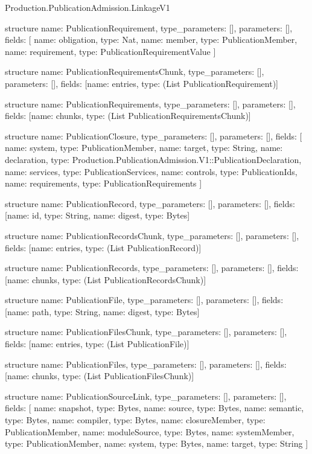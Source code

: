 \begin{lexlean}{Production.PublicationAdmission.LinkageV1}
\begin{semanticmodule}
structure{
  name: PublicationRequirement,
  type_parameters: [],
  parameters: [],
  fields: [
    {name: obligation, type: Nat},
    {name: member, type: PublicationMember},
    {name: requirement, type: PublicationRequirementValue}
  ]
}

structure{
  name: PublicationRequirementsChunk,
  type_parameters: [],
  parameters: [],
  fields: [{name: entries, type: (List PublicationRequirement)}]
}

structure{
  name: PublicationRequirements,
  type_parameters: [],
  parameters: [],
  fields: [{name: chunks, type: (List PublicationRequirementsChunk)}]
}

structure{
  name: PublicationClosure,
  type_parameters: [],
  parameters: [],
  fields: [
    {name: system, type: PublicationMember},
    {name: target, type: String},
    {name: declaration, type: Production.PublicationAdmission.V1::PublicationDeclaration},
    {name: services, type: PublicationServices},
    {name: controls, type: PublicationIds},
    {name: requirements, type: PublicationRequirements}
  ]
}

structure{
  name: PublicationRecord,
  type_parameters: [],
  parameters: [],
  fields: [{name: id, type: String}, {name: digest, type: Bytes}]
}

structure{
  name: PublicationRecordsChunk,
  type_parameters: [],
  parameters: [],
  fields: [{name: entries, type: (List PublicationRecord)}]
}

structure{
  name: PublicationRecords,
  type_parameters: [],
  parameters: [],
  fields: [{name: chunks, type: (List PublicationRecordsChunk)}]
}

structure{
  name: PublicationFile,
  type_parameters: [],
  parameters: [],
  fields: [{name: path, type: String}, {name: digest, type: Bytes}]
}

structure{
  name: PublicationFilesChunk,
  type_parameters: [],
  parameters: [],
  fields: [{name: entries, type: (List PublicationFile)}]
}

structure{
  name: PublicationFiles,
  type_parameters: [],
  parameters: [],
  fields: [{name: chunks, type: (List PublicationFilesChunk)}]
}

structure{
  name: PublicationSourceLink,
  type_parameters: [],
  parameters: [],
  fields: [
    {name: snapshot, type: Bytes},
    {name: source, type: Bytes},
    {name: semantic, type: Bytes},
    {name: compiler, type: Bytes},
    {name: closureMember, type: PublicationMember},
    {name: moduleSource, type: Bytes},
    {name: systemMember, type: PublicationMember},
    {name: system, type: Bytes},
    {name: target, type: String}
  ]
}


\end{semanticmodule}
\end{lexlean}
